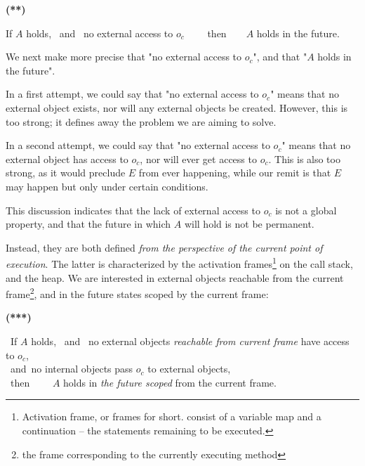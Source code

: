 \vspace{.1cm}

  \begin{minipage}{.05\textwidth}
   \textbf{(**)}
\end{minipage}
\hfill
\begin{minipage}{.95\textwidth}
\begin{flushleft}
If $A$ holds, \  and \     no external access to  $o_c$ \ \ \ \ then\  \ \  \ $A$ holds in the future. 
\end{flushleft}
\end{minipage}

\vspace{.1cm}


\noindent 
We next make more precise that "no external access to  $o_c$", and that "$A$ holds in the future".

In a first attempt, we could say that "no external access to  $o_c$" means  that no external object exists, nor will any external objects be created.
 However, this is too strong; it defines away the problem we are aiming to solve.

In a second attempt, we could say that "no external access to  $o_c$" means that no external object has access to $o_c$, nor will ever get access to $o_c$. This is also too strong, as it would preclude $E$ from ever happening, while our remit is that $E$ may happen but only under certain conditions. 

This discussion indicates that the lack of external access to $o_c$ is not a global property, and that the future in which  $A$ will hold is not be permanent. 

Instead, they are both defined \emph{from the perspective of the current point of execution}.
The latter is characterized by the activation frames\footnote{Activation frame, or frames for short. consist of a variable map and a continuation -- the statements remaining to be executed.} on the call stack, and the heap. 
We are interested in external objects reachable from the current frame\footnote{the frame corresponding to the currently executing method}, and  in the future states scoped by the current frame: 

\vspace{.1cm}

  \begin{minipage}{.05\textwidth}
   \textbf{(***)}
\end{minipage}
\hfill
\begin{minipage}{.95\textwidth}
\begin{flushleft}
\ If $A$ holds, \  and \  no external objects \emph{reachable from current frame}  have access to $o_c$, \\  
\   and\   no  internal objects pass $o_c$ to external objects,  \\
\ then \ \ \  \ $A$ holds in  \emph{the future scoped} from the current frame.   
\end{flushleft}
\end{minipage}

